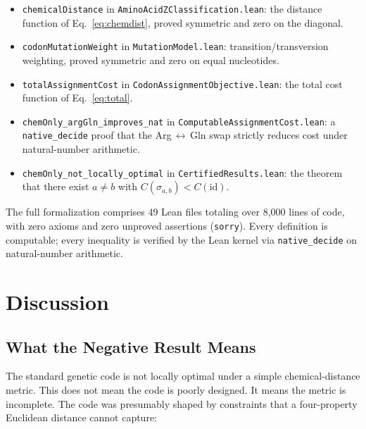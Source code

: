 \documentclass[11pt,twocolumn]{article}
\begin{document}
\begin{itemize}
\item \texttt{chemicalDistance} in \texttt{AminoAcidZClassification.lean}:
  the distance function of Eq.~\eqref{eq:chemdist}, proved symmetric and
  zero on the diagonal.
\item \texttt{codonMutationWeight} in \texttt{MutationModel.lean}:
  transition/transversion weighting, proved symmetric and zero on equal
  nucleotides.
\item \texttt{totalAssignmentCost} in
  \texttt{CodonAssignmentObjective.lean}: the total cost function of
  Eq.~\eqref{eq:total}.
\item \texttt{chemOnly\_argGln\_improves\_nat} in
  \texttt{ComputableAssignmentCost.lean}:
  a \texttt{native\_decide} proof that the Arg\,$\leftrightarrow$\,Gln
  swap strictly reduces cost under natural-number arithmetic.
\item \texttt{chemOnly\_not\_locally\_optimal} in
  \texttt{CertifiedResults.lean}: the
  theorem that there exist $a \neq b$ with
  $C(\sigma_{a,b}) < C(\text{id})$.
\end{itemize}

The full formalization comprises 49 Lean files totaling over 8,000 lines
of code, with zero axioms and zero unproved assertions (\texttt{sorry}).
Every definition is computable; every inequality is verified by the Lean
kernel via \texttt{native\_decide} on natural-number arithmetic.

\section{Discussion}

\subsection{What the Negative Result Means}

The standard genetic code is not locally optimal under a simple
chemical-distance metric. This does not mean the code is poorly designed.
It means the metric is incomplete. The code was presumably shaped by
constraints that a four-property Euclidean distance cannot capture:
\end{document}
